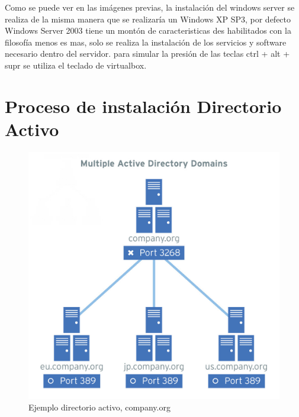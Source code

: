\documentclass[paper=a4, fontsize=12pt]{article} 		%
\numberwithin{equation}{section}						%
\numberwithin{table}{section} 							%
\begin{document}
Como se puede ver en las imágenes previas, la instalación del windows server se realiza de la misma manera que se realizaría un Windows XP SP3, por defecto Windows Server 2003 tiene un montón de caracteristicas des habilitados con la filosofía menos es mas, solo se realiza la instalación de los servicios y software necesario dentro del servidor. para simular la presión de las teclas ctrl + alt + supr se utiliza el teclado de virtualbox.

\newpage
\section{Proceso de instalación Directorio Activo}
\begin{center}
\begin{figure}[H]
\includegraphics[scale=0.4]{imgs/acd.jpg}
\caption{Ejemplo directorio activo, company.org}
\label{fig:acd}
\end{figure}
\end{center}
\end{document}
